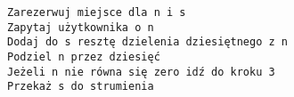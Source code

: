 \begin{verbatim}
Zarezerwuj miejsce dla n i s 
Zapytaj użytkownika o n
Dodaj do s resztę dzielenia dziesiętnego z n
Podziel n przez dziesięć 
Jeżeli n nie równa się zero idź do kroku 3
Przekaż s do strumienia 
\end{verbatim}